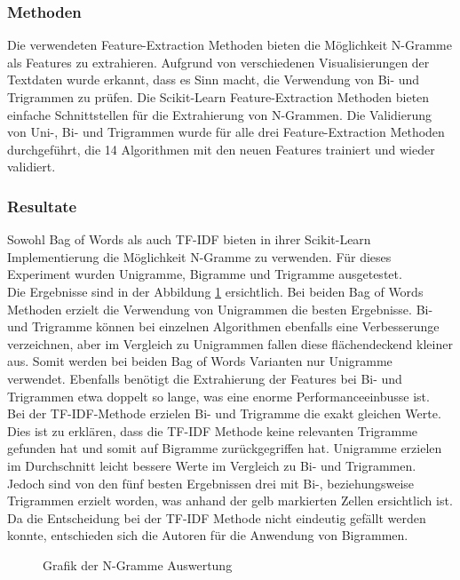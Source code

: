 \subsubsection{Methoden}
Die verwendeten Feature-Extraction Methoden bieten die Möglichkeit N-Gramme als Features zu extrahieren.
Aufgrund von verschiedenen Visualisierungen der Textdaten wurde erkannt, dass es Sinn macht, die Verwendung von Bi- und Trigrammen zu prüfen.
Die Scikit-Learn Feature-Extraction Methoden bieten einfache Schnittstellen für die Extrahierung von N-Grammen.
Die Validierung von Uni-, Bi- und Trigrammen wurde für alle drei Feature-Extraction Methoden durchgeführt, die 14 Algorithmen mit den neuen Features trainiert und wieder validiert.
\subsubsection{Resultate}
Sowohl \glqq Bag of Words\grqq{} als auch TF-IDF bieten in ihrer Scikit-Learn Implementierung die Möglichkeit N-Gramme zu verwenden.
Für dieses Experiment wurden Unigramme, Bigramme und Trigramme ausgetestet.\\
Die Ergebnisse sind in der Abbildung \cref{abb:ngram} ersichtlich.
Bei beiden \glqq Bag of Words\grqq{} Methoden erzielt die Verwendung von Unigrammen die besten Ergebnisse.
Bi- und Trigramme können bei einzelnen Algorithmen ebenfalls eine Verbesserunge verzeichnen, aber im Vergleich zu Unigrammen fallen diese flächendeckend kleiner aus.
Somit werden bei beiden \glqq Bag of Words\grqq{} Varianten nur Unigramme verwendet.
Ebenfalls benötigt die Extrahierung der Features bei Bi- und Trigrammen etwa doppelt so lange, was eine enorme Performanceeinbusse ist.\\
Bei der TF-IDF-Methode erzielen Bi- und Trigramme die exakt gleichen Werte.
Dies ist zu erklären, dass die TF-IDF Methode keine relevanten Trigramme gefunden hat und somit auf Bigramme zurückgegriffen hat.
Unigramme erzielen im Durchschnitt leicht bessere Werte im Vergleich zu Bi- und Trigrammen.
Jedoch sind von den fünf besten Ergebnissen drei mit Bi-, beziehungsweise Trigrammen erzielt worden, was anhand der gelb markierten Zellen ersichtlich ist.
Da die Entscheidung bei der TF-IDF Methode nicht eindeutig gefällt werden konnte, entschieden sich die Autoren für die Anwendung von Bigrammen.
\begin{figure}[H]	
	\setlength{\fboxsep}{0.3pt} 
	\setlength{\fboxrule}{0.3pt} 
	\caption{Grafik der N-Gramme Auswertung}
	\label{abb:ngram}
\end{figure}

